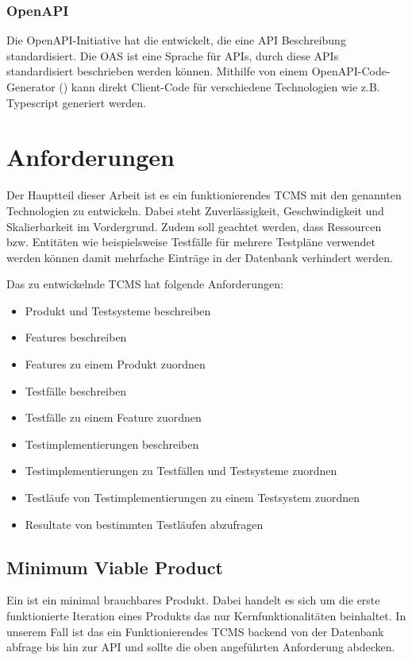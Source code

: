 \documentclass[a4paper, fontsize=11pt, parskip=half, twoside]{scrreprt}
\begin{document}
	\textcite{billwagner_net_nodate}
	
	\subsection{OpenAPI}
	Die OpenAPI-Initiative hat die  entwickelt, die eine \ac{API} Beschreibung standardisiert.
	Die \ac{OAS} ist eine Sprache für  \ac{API}s, durch diese \ac{API}s standardisiert beschrieben werden können. 
	Mithilfe von einem OpenAPI-Code-Generator (\textcite{noauthor_openapi_nodate-1}) kann direkt Client-Code für verschiedene Technologien wie z.B. Typescript generiert werden.
	
	\textcite{noauthor_openapi_nodate}
	
	
	\chapter{Anforderungen} \label{chapter:requiremnts}
	Der Hauptteil dieser Arbeit ist es ein funktionierendes \ac{TCMS} mit den genannten Technologien zu entwickeln.
	Dabei steht Zuverlässigkeit, Geschwindigkeit und Skalierbarkeit im Vordergrund.
	Zudem soll geachtet werden, dass Ressourcen bzw. Entitäten wie beispielsweise Testfälle für mehrere Testpläne verwendet werden können damit mehrfache Einträge in der Datenbank verhindert werden.
	
	Das zu entwickelnde \ac{TCMS} hat folgende Anforderungen:
	
	\begin{itemize}
		\setlength\itemsep{-0.5em}
		\item Produkt und Testsysteme beschreiben
		\item Features beschreiben
		\item Features zu einem Produkt zuordnen
		\item Testfälle beschreiben
		\item Testfälle zu einem Feature zuordnen
		\item Testimplementierungen beschreiben
		\item Testimplementierungen zu Testfällen und Testsysteme zuordnen
		\item Testläufe von Testimplementierungen zu einem Testsystem zuordnen
		\item Resultate von bestimmten Testläufen abzufragen
	\end{itemize}
	
	
	\section{Minimum Viable Product}
	Ein  ist ein minimal brauchbares Produkt. 
	Dabei handelt es sich um die erste funktionierte Iteration eines Produkts das nur Kernfunktionalitäten beinhaltet.
	In unserem Fall ist das ein Funktionierendes \ac{TCMS} backend von der Datenbank abfrage bis hin zur \ac{API} und sollte die oben angeführten Anforderung abdecken.
	
\end{document}
